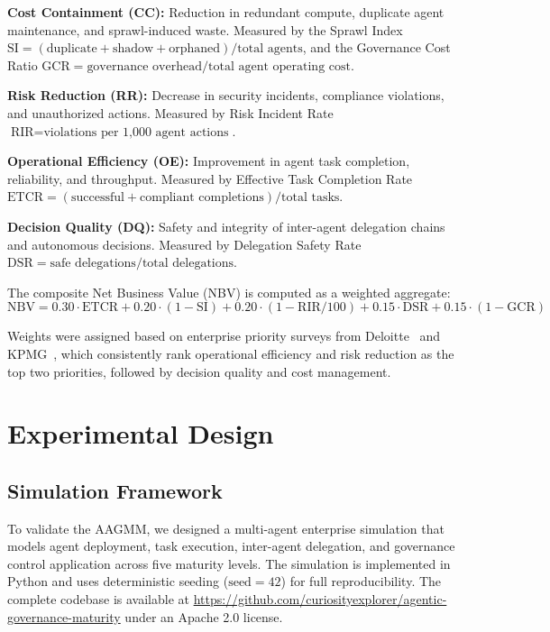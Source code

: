 \documentclass[ai,article,submit,pdftex,moreauthors]{Definitions/mdpi}
\begin{document}
\textbf{Cost Containment (CC):} Reduction in redundant compute, duplicate agent maintenance, and sprawl-induced waste. Measured by the Sprawl Index $\text{SI} = (\text{duplicate} + \text{shadow} + \text{orphaned}) / \text{total agents}$, and the Governance Cost Ratio $\text{GCR} = \text{governance overhead} / \text{total agent operating cost}$.

\textbf{Risk Reduction (RR):} Decrease in security incidents, compliance violations, and unauthorized actions. Measured by Risk Incident Rate $\text{RIR} = \text{violations per 1{,}000 agent actions}$.

\textbf{Operational Efficiency (OE):} Improvement in agent task completion, reliability, and throughput. Measured by Effective Task Completion Rate $\text{ETCR} = (\text{successful} + \text{compliant completions}) / \text{total tasks}$.

\textbf{Decision Quality (DQ):} Safety and integrity of inter-agent delegation chains and autonomous decisions. Measured by Delegation Safety Rate $\text{DSR} = \text{safe delegations} / \text{total delegations}$.

The composite Net Business Value (NBV) is computed as a weighted aggregate:
\begin{equation}\label{eq:nbv}
\text{NBV} = 0.30 \cdot \text{ETCR} + 0.20 \cdot (1 - \text{SI}) + 0.20 \cdot (1 - \text{RIR}/100) + 0.15 \cdot \text{DSR} + 0.15 \cdot (1 - \text{GCR})
\end{equation}

Weights were assigned based on enterprise priority surveys from Deloitte~\cite{deloitte2026state} and KPMG~\cite{kpmg2026q4pulse}, which consistently rank operational efficiency and risk reduction as the top two priorities, followed by decision quality and cost management.


\section{Experimental Design}\label{sec:experimental}

\subsection{Simulation Framework}\label{sec:exp-simulation}

To validate the AAGMM, we designed a multi-agent enterprise simulation that models agent deployment, task execution, inter-agent delegation, and governance control application across five maturity levels. The simulation is implemented in Python and uses deterministic seeding ($\text{seed} = 42$) for full reproducibility. The complete codebase is available at \url{https://github.com/curiosityexplorer/agentic-governance-maturity} under an Apache 2.0 license.
\end{document}
